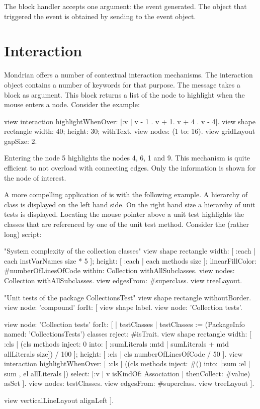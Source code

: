 \documentclass[a4paper,10pt,twoside]{book}
\begin{document}
The block handler accepts one argument: the event generated. The object that triggered the event is obtained by sending  to the event object. 


\section{Interaction}
Mondrian offers a number of contextual interaction mechanisms. The interaction object contains a number of keywords for that purpose. The message  takes a block as argument. This block returns a list of the node to highlight when the mouse enters a node. Consider the example:

\begin{code}{}
view interaction 
  highlightWhenOver: [:v | {v - 1 . v + 1. v + 4 . v - 4}].
view shape rectangle 
  width: 40;
  height: 30;
  withText.
view nodes: (1 to: 16).
view gridLayout gapSize: 2.
\end{code}

Entering the node 5 highlights the nodes 4, 6, 1 and 9. This mechanism is quite efficient to not overload with connecting edges. Only the information is shown for the node of interest. 

A more compelling application of  is with the following example. A hierarchy of class is displayed on the left hand side. On the right hand size a hierarchy of unit tests is displayed. Locating the mouse pointer above a unit test highlights the classes that are referenced by one of the unit test method. Consider the (rather long) script:

\begin{code}{}
"System complexity of the collection classes"
view shape rectangle
  width: [ :each | each instVarNames size * 5 ];
  height: [ :each | each methods size ];
  linearFillColor: #numberOfLinesOfCode within: Collection withAllSubclasses.
view nodes: Collection withAllSubclasses.
view edgesFrom: #superclass.
view treeLayout.

"Unit tests of the package CollectionsTest"
view shape rectangle withoutBorder.
view node: 'compound' forIt: [
  view shape label.
  view node: 'Collection tests'.
  
  view node: 'Collection tests' forIt: [
    | testClasses |
    testClasses := (PackageInfo named: 'CollectionsTests') classes reject: #isTrait.
    view shape rectangle
      width: [ :cls | (cls methods inject: 0 into: [ :sumLiterals :mtd | sumLiterals + mtd allLiterals size]) / 100 ];
      height: [ :cls | cls numberOfLinesOfCode / 50 ].
    view interaction 
        highlightWhenOver: [ :cls | ((cls methods inject: #() 
                        into: [:sum :el | sum , el allLiterals ]) select: [:v | v isKindOf: Association ] thenCollect: #value) asSet ].
    view nodes: testClasses.
    view edgesFrom: #superclass.
    view treeLayout ].
  
  view verticalLineLayout alignLeft
].
\end{code}
\end{document}
